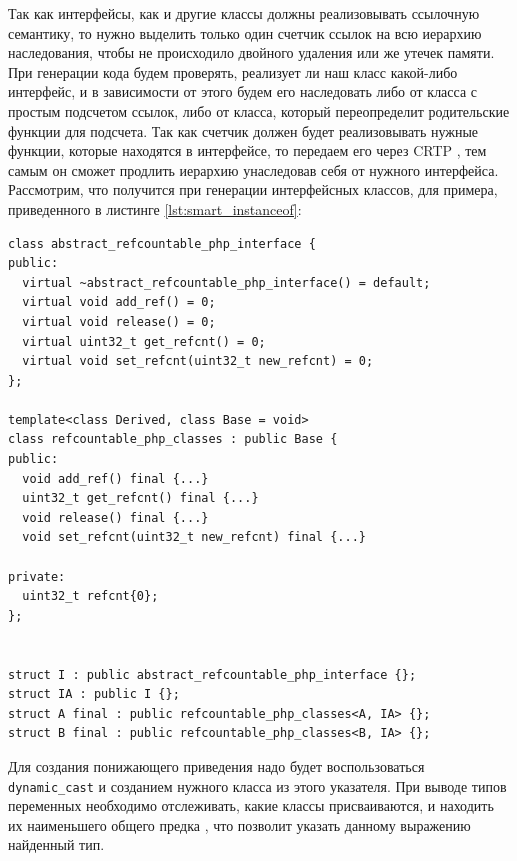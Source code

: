 Так как интерфейсы, как и другие классы должны реализовывать ссылочную семантику, то нужно выделить только один счетчик ссылок на всю иерархию наследования, чтобы не происходило двойного удаления или же утечек памяти.
При генерации кода будем проверять, реализует ли наш класс какой-либо интерфейс, и в зависимости от этого будем его наследовать либо от класса с простым подсчетом ссылок, либо от класса, который переопределит родительские функции для подсчета.
Так как счетчик должен будет реализовывать нужные функции, которые находятся в интерфейсе, то передаем его через CRTP \cite{crtp}, тем самым он сможет продлить иерархию унаследовав себя от нужного интерфейса.
Рассмотрим, что получится при генерации интерфейсных классов, для примера, приведенного в листинге \ref{lst:smart_instanceof}:
\begin{lstlisting}
class abstract_refcountable_php_interface {
public:
  virtual ~abstract_refcountable_php_interface() = default;
  virtual void add_ref() = 0;
  virtual void release() = 0;
  virtual uint32_t get_refcnt() = 0;
  virtual void set_refcnt(uint32_t new_refcnt) = 0;
};

template<class Derived, class Base = void>
class refcountable_php_classes : public Base {
public:
  void add_ref() final {...}
  uint32_t get_refcnt() final {...}
  void release() final {...}
  void set_refcnt(uint32_t new_refcnt) final {...}

private:
  uint32_t refcnt{0};
};


struct I : public abstract_refcountable_php_interface {};
struct IA : public I {};
struct A final : public refcountable_php_classes<A, IA> {};
struct B final : public refcountable_php_classes<B, IA> {};
\end{lstlisting}

Для создания понижающего приведения надо будет воспользоваться \verb|dynamic_cast| и созданием нужного класса из этого указателя.
При выводе типов переменных необходимо отслеживать, какие классы присваиваются, и находить их наименьшего общего предка \cite{lca}, что позволит указать данному выражению найденный тип.

